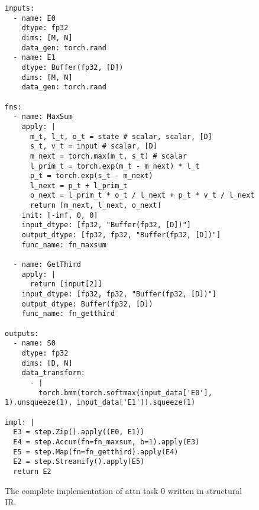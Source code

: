 \begin{figure}[htbp]
\centering
\begin{lstlisting}[language=step, mathescape=true, basicstyle=\scriptsize\ttfamily]
inputs:
  - name: E0
    dtype: fp32
    dims: [M, N]
    data_gen: torch.rand
  - name: E1
    dtype: Buffer(fp32, [D])
    dims: [M, N]
    data_gen: torch.rand
  
fns:
  - name: MaxSum
    apply: |
      m_t, l_t, o_t = state # scalar, scalar, [D]
      s_t, v_t = input # scalar, [D]
      m_next = torch.max(m_t, s_t) # scalar
      l_prim_t = torch.exp(m_t - m_next) * l_t
      p_t = torch.exp(s_t - m_next)
      l_next = p_t + l_prim_t
      o_next = l_prim_t * o_t / l_next + p_t * v_t / l_next
      return [m_next, l_next, o_next]
    init: [-inf, 0, 0]
    input_dtype: [fp32, "Buffer(fp32, [D])"]
    output_dtype: [fp32, fp32, "Buffer(fp32, [D])"]
    func_name: fn_maxsum

  - name: GetThird
    apply: |
      return [input[2]]
    input_dtype: [fp32, fp32, "Buffer(fp32, [D])"]
    output_dtype: Buffer(fp32, [D])
    func_name: fn_getthird

outputs:
  - name: S0
    dtype: fp32
    dims: [D, N]
    data_transform:
      - |
        torch.bmm(torch.softmax(input_data['E0'], 1).unsqueeze(1), input_data['E1']).squeeze(1)

impl: |
  E3 = step.Zip().apply((E0, E1))
  E4 = step.Accum(fn=fn_maxsum, b=1).apply(E3)
  E5 = step.Map(fn=fn_getthird).apply(E4)
  E2 = step.Streamify().apply(E5)
  return E2

\end{lstlisting}
\caption{The complete implementation of attn task 0 written in structural IR.}
\label{fig:impl-attn0-yaml}
\end{figure}


